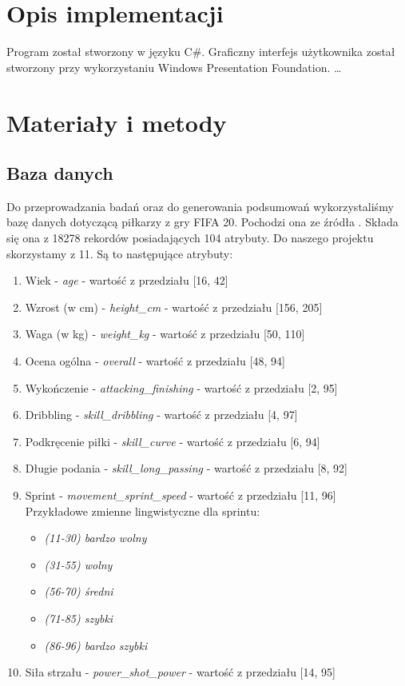 \documentclass{classrep}
\begin{document}
	\section{Opis implementacji} %
	Program został stworzony w języku C\#. Graficzny interfejs użytkownika został stworzony przy wykorzystaniu Windows Presentation Foundation. \ldots 
	
	\section{Materiały i metody} %
	\subsection{Baza danych}
	Do przeprowadzania badań oraz do generowania podsumowań wykorzystaliśmy bazę danych dotyczącą piłkarzy z gry FIFA 20. Pochodzi ona ze źródła \cite{baza}. Składa się ona z 18278 rekordów posiadających 104 atrybuty. Do naszego projektu skorzystamy z 11. Są to następujące atrybuty:
	
	\begin{enumerate}
		\item Wiek - \textsl{age} - wartość z przedziału [16, 42] \\
		\item Wzrost (w cm) - \textsl{height\_cm} - wartość z przedziału [156, 205] \\
		\item Waga (w kg) - \textsl{weight\_kg} - wartość z przedziału [50, 110]
		\item Ocena ogólna - \textsl{overall} - wartość z przedziału [48, 94]
		\item Wykończenie - \textsl{attacking\_finishing} - wartość z przedziału [2, 95]
		\item Dribbling - \textsl{skill\_dribbling} - wartość z przedziału [4, 97]
		\item Podkręcenie piłki - \textsl{skill\_curve} - wartość z przedziału [6, 94]
		\item Długie podania - \textsl{skill\_long\_passing} - wartość z przedziału [8, 92]
		\item Sprint - \textsl{movement\_sprint\_speed} - wartość z przedziału [11, 96] \\
		Przykładowe zmienne lingwistyczne dla sprintu: 
		\begin{itemize}
			\item \textsl{(11-30) bardzo wolny}
			\item \textsl{(31-55) wolny}
			\item \textsl{(56-70) średni}
			\item \textsl{(71-85) szybki}
			\item \textsl{(86-96) bardzo szybki}
		\end{itemize}
		\item Siła strzału - \textsl{power\_shot\_power} - wartość z przedziału [14, 95]
	\end{enumerate}
\end{document}
